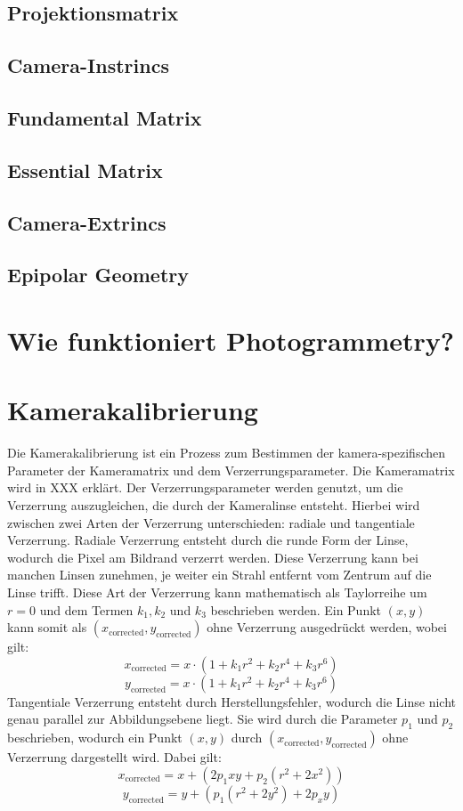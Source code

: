 \subsection{Projektionsmatrix}
\subsection{Camera-Instrincs}
\subsection{Fundamental Matrix}
\subsection{Essential Matrix}
\subsection{Camera-Extrincs}
\subsection{Epipolar Geometry}

\section{Wie funktioniert Photogrammetry?}

\section{Kamerakalibrierung}
Die Kamerakalibrierung ist ein Prozess zum Bestimmen der kamera-spezifischen Parameter der Kameramatrix und dem Verzerrungsparameter. 
Die Kameramatrix wird in XXX erklärt.
Der Verzerrungsparameter werden genutzt, um die Verzerrung auszugleichen, die durch der Kameralinse entsteht.
Hierbei wird zwischen zwei Arten der Verzerrung unterschieden: radiale und tangentiale Verzerrung.
Radiale Verzerrung entsteht durch die runde Form der Linse, wodurch die Pixel am Bildrand verzerrt werden.
Diese Verzerrung kann bei manchen Linsen zunehmen, je weiter ein Strahl entfernt vom Zentrum auf die Linse trifft. 
Diese Art der Verzerrung kann mathematisch als Taylorreihe um $r = 0$ und dem Termen $k_1, k_2$ und $k_3$ beschrieben werden.
Ein Punkt $(x, y)$ kann somit als $(x_{\text{corrected}},y_{\text{corrected}})$ ohne Verzerrung ausgedrückt werden, wobei gilt:
\[x_\text{corrected} = x \cdot (1 + k_1r^2 + k_2r^4 + k_3r^6)\]
\[y_\text{corrected} = x \cdot (1 + k_1r^2 + k_2r^4 + k_3r^6)\]
Tangentiale Verzerrung entsteht durch Herstellungsfehler, wodurch die Linse nicht genau parallel zur Abbildungsebene liegt.  
Sie wird durch die Parameter $p_1$ und $p_2$ beschrieben, wodurch ein Punkt $(x,y)$ durch $(x_{\text{corrected}},y_{\text{corrected}})$ ohne Verzerrung dargestellt wird. 
Dabei gilt:
\[x_\text{corrected} = x + (2p_1xy + p_2(r^2 + 2x^2))\]
\[y_\text{corrected} = y + (p_1(r^2 + 2y^2) + 2p_xy)\]
\cite{kaehler_2016}

